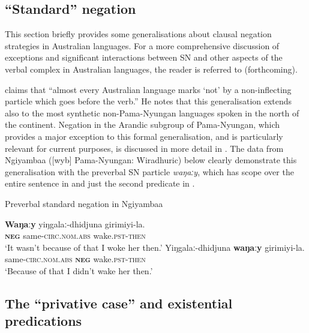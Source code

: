 \documentclass[output=paper,draft,draftmode,colorlinks,citecolor=brown]{langscibook}
\begin{document}
\subsection{``Standard'' negation}

This section briefly provides some generalisations about clausal negation strategies in Australian languages. For a more comprehensive discussion of exceptions and significant interactions between SN and other aspects of the verbal complex in Australian languages, the reader is referred to \citeauthor{PhillipsFCb} (forthcoming).

\citet[82]{Dixon2002a} claims that ``almost every Australian language marks
`not' by a non-inflecting particle which goes before the verb.'' He notes
that this generalisation extends also to the most synthetic
non-Pama-Nyungan languages spoken in the north of the continent. Negation
in the Arandic subgroup of Pama-Nyungan, which provides a major exception
to this formal generalisation, and is particularly relevant for current
purposes, is discussed in more detail in . The data
from Ngiyambaa ([wyb] Pama-Nyungan: Wiradhuric) below clearly demonstrate
this generalisation with the preverbal SN particle \textit{waŋaːy}, which
has scope over the entire sentence in  and just the second predicate in .
\begin{exe}\ex\label{sn-wyb} Preverbal standard negation in Ngiyambaa \citep[239]{Donaldson1980}
    \begin{xlist}
\ex\label{ex:austr-Ngiyambaa-wake-a}
    \gll \textbf{Waŋaːy} yiŋgalaː-dhi\textdblhyphen dju\textdblhyphen na girimiyi-la.\\
\textsc{\textbf{neg}} same-\textsc{circ}.\textsc{nom}.\textsc{abs} wake\textsc{.pst-then}\\
\glt `It wasn't because of that I woke her then.'
\ex\label{ex:austr-Ngiyambaa-wake-b}
    \gll Yiŋgalaː-dhi\textdblhyphen dju\textdblhyphen na \textbf{waŋaːy} girimiyi-la.\\
same-\textsc{circ}.\textsc{nom}.\textsc{abs} \textsc{\textbf{neg}} wake\textsc{.pst-then}\\
\glt `Because of that I didn't wake her then.'
    \end{xlist}\end{exe}

\subsection{The ``privative case'' and existential predications}\label{sec:austr-2.2}
\end{document}
